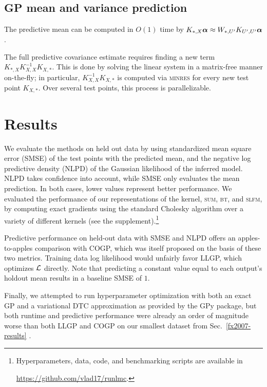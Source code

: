 \documentclass[twoside]{article}
\newif\ifanonymized
\begin{document}
\subsection{GP mean and variance prediction}
    
The predictive mean can be computed in $O(1)$ time by $K_{*,X}{\boldsymbol\alpha}\approx W_{*,{U'}}K_{{U'},{U'}}{\boldsymbol\alpha}$ \citep{msgp}.

The full predictive covariance estimate requires finding a new term $K_{*,X}K_{X,X}^{-1}K_{X,*}$. This is done by solving the linear system in a matrix-free manner on-the-fly; in particular, $K_{X,X}^{-1}K_{X,*}$ is computed via \textsc{minres} for every new test point $K_{X,*}$. Over several test points, this process is parallelizable.

\section{Results}
\label{sec:results}
We evaluate the methods on held out data by using standardized mean square error (SMSE) of the test points with the predicted mean, and the negative log predictive density (NLPD) of the Gaussian likelihood of the inferred model. NLPD takes confidence into account, while SMSE only evaluates the mean prediction. In both cases, lower values represent better performance. We evaluated the performance of our representations of the kernel, \textsc{sum}, \textsc{bt}, and \textsc{slfm}, by computing exact gradients using the standard Cholesky algorithm over a variety of different kernels (see the supplement).\footnote{Hyperparameters, data, code, and benchmarking scripts are available in
  \ifanonymized
  \texttt{<anonymous repository>}.
  \else
  \url{https://github.com/vlad17/runlmc}.
  \fi
}

Predictive performance on held-out data with SMSE and NLPD offers an apples-to-apples comparison with COGP, which was itself proposed on the basis of these two metrics. Training data log likelihood would unfairly favor LLGP, which optimizes $\mathcal{L}$ directly. Note that predicting a constant value equal to each output's holdout mean results in a baseline SMSE of $1$.

Finally, we attempted to run hyperparameter optimization with both an exact GP and a variational DTC approximation as provided by the GPy package, but both runtime and predictive performance were already an order of magnitude worse than both LLGP and COGP on our smallest dataset from Sec.~\ref{fx2007-results} \citep{gpy2014}.
\end{document}
